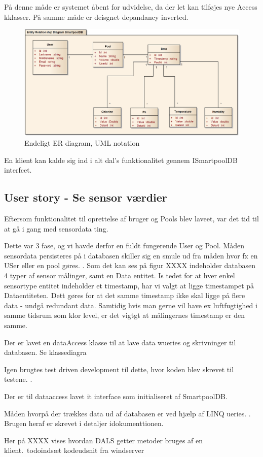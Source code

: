 På denne måde er systemet åbent for udvidelse, da der let kan tilføjes nye Access kklasser. På samme måde er deisgnet depandancy inverted.

\begin{figure}[h]
	\centering
	\includegraphics[width=\linewidth]{figs/design/databaseERD_final_uml}
	\caption{Endeligt ER diagram, UML notation}
	\label{fig:databaseERD_final_uml}
\end{figure}

En klient kan kalde sig ind i alt dal's funktionalitet gennem ISmartpoolDB interfcet.



\subsection{User story - Se sensor værdier}

Eftersom funktionalitet til oprettelse af bruger og Pools blev laveet, var  det tid til at gå i gang med sensordata ting.

Dette var 3 fase, og vi havde derfor en fuldt fungerende User og Pool. Måden sensordata persisteres på i databasen skiller sig en smule ud fra måden hvor fx en USer eller en pool gøres. . Som det kan ses på figur XXXX indeholder databasen 4 typer af sensor målinger, samt en Data entitet. Is tedet for at hver enkel sensortype entitet indeholder et timestamp, har vi valgt at ligge timestampet på Dataentiteten. Dett gøres for at det samme timestamp ikke skal ligge på flere data - undgå redundant data.  Samtidig hvis man gerne vil have ex luftfugtighed i samme tidsrum som klor level, er det vigtgt at målingernes timestamp er den samme.

Der er lavet en dataAccess klasse til at lave data wueries og skrivninger til databasen. Se klassediagra 

Igen brugtes test driven development til dette, hvor koden blev skrevet til testene.  .

Der er til dataaccess lavet it interface som initialiseret af SmartpoolDB.

Måden hvorpå der trækkes data ud af databasen er ved hjælp af LINQ ueries. . Brugen heraf er skrevet i detaljer idokumenttionen.

Her på XXXX vises hvordan DALS getter metoder bruges af en klient.\ todo{indsæt kodeudsnit fra windserver}